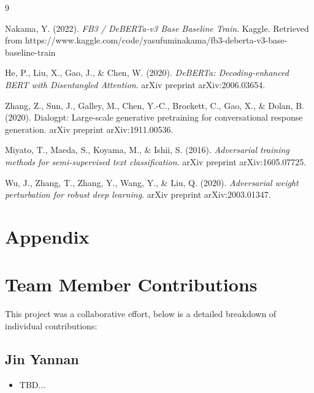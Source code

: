 \documentclass[12pt]{article}
\begin{document}
\begin{thebibliography}{9}

Nakama, Y. (2022).
\textit{FB3 / DeBERTa-v3 Base Baseline Train}.
Kaggle. Retrieved from https://www.kaggle.com/code/yasufuminakama/fb3-deberta-v3-base-baseline-train

He, P., Liu, X., Gao, J., \& Chen, W. (2020).
\textit{DeBERTa: Decoding-enhanced BERT with Disentangled Attention}.
arXiv preprint arXiv:2006.03654.

Zhang, Z., Sun, J., Galley, M., Chen, Y.-C., Brockett, C., Gao, X., \& Dolan, B. (2020).
Dialogpt: Large-scale generative pretraining for conversational response generation.
arXiv preprint arXiv:1911.00536.

Miyato, T., Maeda, S., Koyama, M., \& Ishii, S. (2016).
\textit{Adversarial training methods for semi-supervised text classification}.
arXiv preprint arXiv:1605.07725.

Wu, J., Zhang, T., Zhang, Y., Wang, Y., \& Liu, Q. (2020).
\textit{Adversarial weight perturbation for robust deep learning}.
arXiv preprint arXiv:2003.01347.

\end{thebibliography}

\appendix
\section*{Appendix}

\renewcommand{\thefigure}{A\arabic{figure}}
\renewcommand{\thetable}{A\arabic{table}}
\renewcommand{\theequation}{A\arabic{equation}}
\setcounter{figure}{0}
\setcounter{table}{0}
\setcounter{equation}{0}

\section{Team Member Contributions}
\label{app:contributions}
This project was a collaborative effort, below is a detailed breakdown of individual contributions:

\subsection*{Jin Yannan}
\begin{itemize}
    \item TBD...
\end{itemize}
\end{document}
